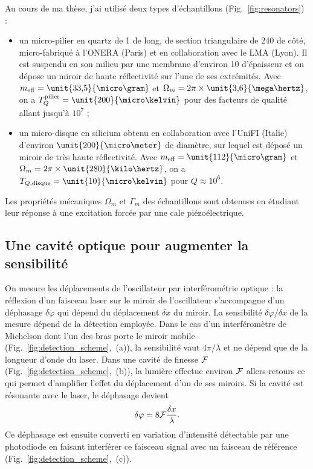 \documentclass[12pt,a4paper]{article}
\begin{document}
Au cours de ma thèse, j'ai utilisé deux types d'échantillons (Fig.~\ref{fig:resonators}) :
\begin{itemize}
\item un micro-pilier en quartz de \unit{1}{\milli\meter} de long, de section triangulaire de \unit{240}{\micro\meter} de côté, micro-fabriqué à l'ONERA (Paris) et en collaboration avec le LMA (Lyon).
Il est suspendu en son milieu par une membrane d'environ \unit{10}{\micro\meter} d'épaisseur et on dépose un miroir de haute réflectivité sur l'une de ses extrémités.
Avec $m_\mathrm{eff}=\unit{33{,}5}{\micro\gram}$ et $\Omega_m=2\pi\times\unit{3{,}6}{\mega\hertz}$, on a $T_{Q}^\mathrm{pilier} = \unit{200}{\micro\kelvin}$ pour des facteurs de qualité allant jusqu'à $10^7$ ;
\item un micro-disque en silicium obtenu en collaboration avec l'UniFI (Italie) d'environ $\unit{200}{\micro\meter}$ de diamètre, sur lequel est déposé un miroir de très haute réflectivité.
Avec $m_\mathrm{eff}=\unit{112}{\micro\gram}$ et $\Omega_m=2\pi\times\unit{280}{\kilo\hertz}$, on a $T_{Q,\mathrm{disque}} = \unit{10}{\micro\kelvin}$ pour $Q\approx10^6$.
\end{itemize}
Les propriétés mécaniques $\Omega_m$ et $\Gamma_m$ des échantillons sont obtenues en étudiant leur réponse à une excitation forcée par une cale piézoélectrique.

\subsection{Une cavité optique pour augmenter la sensibilité}
\label{sec:cavity}

On mesure les déplacements de l'oscillateur par interférométrie optique : la réflexion d'un faisceau laser sur le miroir de l'oscillateur s'accompagne d'un déphasage $\delta\varphi$ qui dépend du déplacement $\delta x$ du miroir.
La sensibilité $\delta\varphi / \delta x$ de la mesure dépend de la détection employée.
Dans le cas d'un interféromètre de Michelson dont l'un des bras porte le miroir mobile (Fig.~\ref{fig:detection_scheme},~(a)), la sensibilité vaut $4\pi/\lambda$ et ne dépend que de la longueur d'onde du laser.
Dans une cavité de finesse $\cal{F}$ (Fig.~\ref{fig:detection_scheme},~(b)), la lumière effectue environ $\cal{F}$ allers-retours ce qui permet d'amplifier l'effet du déplacement d'un de ses miroirs.
Si la cavité est résonante avec le laser, le déphasage devient
\begin{equation}
\delta \varphi = 8{\cal{F}}\frac{\delta x}{\lambda}.
\end{equation}
Ce déphasage est ensuite converti en variation d'intensité détectable par une photodiode en faisant interférer ce faisceau signal avec un faisceau de référence (Fig.~\ref{fig:detection_scheme},~(c)).
\end{document}

